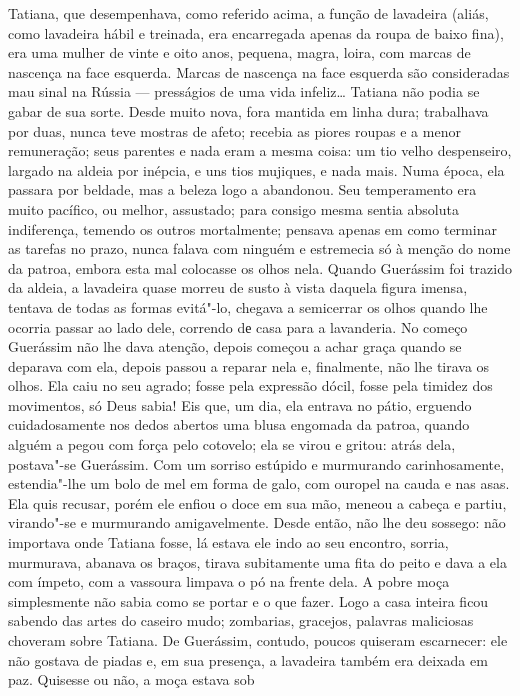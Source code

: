Tatiana, que desempenhava, como referido acima, a função de lavadeira
(aliás, como lavadeira hábil e treinada, era encarregada apenas da roupa
de baixo fina), era uma mulher de vinte e oito anos, pequena, magra,
loira, com marcas de nascença na face esquerda. Marcas de nascença na
face esquerda são consideradas mau sinal na Rússia --- presságios de uma
vida infeliz\ldots{} Tatiana não podia se gabar de sua sorte. Desde muito
nova, fora mantida em linha dura; trabalhava por duas, nunca teve
mostras de afeto; recebia as piores roupas e a menor remuneração; seus
parentes e nada eram a mesma coisa: um tio velho despenseiro, largado na
aldeia por inépcia, e uns tios mujiques, e nada mais. Numa época, ela
passara por beldade, mas a beleza logo a abandonou. Seu temperamento era
muito pacífico, ou melhor, assustado; para consigo mesma sentia absoluta
indiferença, temendo os outros mortalmente; pensava apenas em como
terminar as tarefas no prazo, nunca falava com ninguém e estremecia só à
menção do nome da patroa, embora esta mal colocasse os olhos nela.
Quando Guerássim foi trazido da aldeia, a lavadeira quase morreu de
susto à vista daquela figura imensa, tentava de todas as formas
evitá"-lo, chegava a semicerrar os olhos quando lhe ocorria passar ao
lado dele, correndo dе casa para a lavanderia. No começo Guerássim não
lhe dava atenção, depois começou a achar graça quando se deparava com
ela, depois passou a reparar nela e, finalmente, não lhe tirava os
olhos. Ela caiu no seu agrado; fosse pela expressão dócil, fosse pela
timidez dos movimentos, só Deus sabia! Eis que, um dia, ela entrava no
pátio, erguendo cuidadosamente nos dedos abertos uma blusa engomada da
patroa, quando alguém a pegou com força pelo cotovelo; ela se virou e
gritou: atrás dela, postava"-se Guerássim. Com um sorriso estúpido e
murmurando carinhosamente, estendia"-lhe um bolo de mel em forma de galo,
com ouropel na cauda e nas asas. Ela quis recusar, porém ele enfiou o
doce em sua mão, meneou a cabeça e partiu, virando"-se e murmurando
amigavelmente. Desde então, não lhe deu sossego: não importava onde
Tatiana fosse, lá estava ele indo ao seu encontro, sorria, murmurava,
abanava os braços, tirava subitamente uma fita do peito e dava a ela com
ímpeto, com a vassoura limpava o pó na frente dela. A pobre moça
simplesmente não sabia como se portar e o que fazer. Logo a casa inteira
ficou sabendo das artes do caseiro mudo; zombarias, gracejos, palavras
maliciosas choveram sobre Tatiana. De Guerássim, contudo, poucos
quiseram escarnecer: ele não gostava de piadas e, em sua presença, a
lavadeira também era deixada em paz. Quisesse ou não, a moça estava sob
